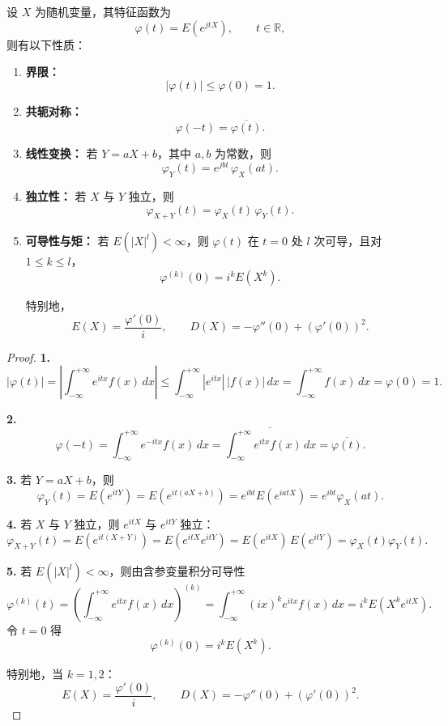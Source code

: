 \begin{proposition}[随机变量特征函数的性质]
设 $X$ 为随机变量，其特征函数为 
\[
\varphi(t)=E(e^{jtX}),\qquad t\in\mathbb R,
\]
则有以下性质：

\begin{enumerate}
  \item \textbf{界限：}
  \[
  |\varphi(t)|\le \varphi(0)=1 .
  \]

  \item \textbf{共轭对称：}
  \[
  \varphi(-t)=\overline{\varphi(t)} .
  \]

  \item \textbf{线性变换：} 若 $Y=aX+b$，其中 $a,b$ 为常数，则
  \[
  \varphi_Y(t)=e^{jbt}\,\varphi_X(at).
  \]

  \item \textbf{独立性：} 若 $X$ 与 $Y$ 独立，则
  \[
  \varphi_{X+Y}(t)=\varphi_X(t)\,\varphi_Y(t).
  \]

  \item \textbf{可导性与矩：} 若 $E(|X|^l)<\infty$，则 $\varphi(t)$ 在 $t=0$ 处 $l$ 次可导，且对 $1\le k\le l$，
  \[
  \varphi^{(k)}(0)=i^k E(X^k).
  \]

  特别地，
  \[
  E(X)=\frac{\varphi'(0)}{i},\qquad 
  D(X)=-\varphi''(0)+(\varphi'(0))^2 .
  \]

\end{enumerate}
\end{proposition}
\begin{proof}
\textbf{1.} 
\[
|\varphi(t)|
=\left|\int_{-\infty}^{+\infty} e^{itx} f(x)\,dx\right|
\le \int_{-\infty}^{+\infty} |e^{itx}|\,|f(x)|\,dx
= \int_{-\infty}^{+\infty} f(x)\,dx
=\varphi(0)=1.
\]

\textbf{2.}
\[
\varphi(-t)
=\int_{-\infty}^{+\infty} e^{-itx} f(x)\,dx
=\overline{\int_{-\infty}^{+\infty} e^{itx} f(x)\,dx}
=\overline{\varphi(t)}.
\]

\textbf{3.} 若 $Y=aX+b$，则
\[
\varphi_Y(t)
=E(e^{itY})
=E(e^{it(aX+b)})
=e^{ibt}E(e^{iatX})
=e^{ibt}\varphi_X(at).
\]

\textbf{4.} 若 $X$ 与 $Y$ 独立，则 $e^{itX}$ 与 $e^{itY}$ 独立：
\[
\varphi_{X+Y}(t)
=E(e^{it(X+Y)})
=E(e^{itX}e^{itY})
=E(e^{itX})\,E(e^{itY})
=\varphi_X(t)\varphi_Y(t).
\]

\textbf{5.} 若 $E(|X|^l)<\infty$，则由含参变量积分可导性
\[
\varphi^{(k)}(t)
=\left(\int_{-\infty}^{+\infty} e^{itx} f(x)\,dx\right)^{(k)}
=\int_{-\infty}^{+\infty} (ix)^k e^{itx} f(x)\,dx
= i^k E(X^k e^{itX}).
\]
令 $t=0$ 得
\[
\varphi^{(k)}(0)= i^k E(X^k).
\]

特别地，当 $k=1,2$：
\[
E(X)=\frac{\varphi'(0)}{i}, 
\qquad
D(X)= -\varphi''(0)+(\varphi'(0))^2.
\]
\end{proof}
